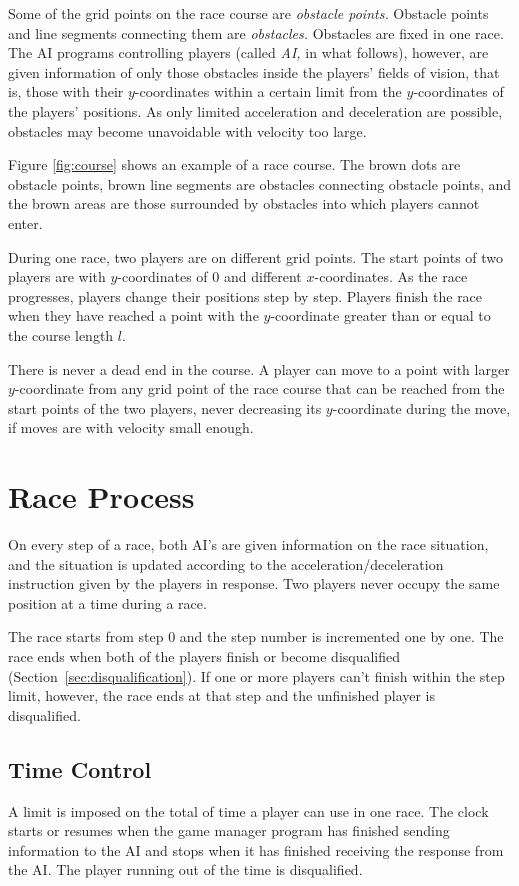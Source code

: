 \documentclass[11pt]{article}
\newcommand\secref[1]{\mbox{Section~\ref{#1}}}
\begin{document}
Some of the grid points on the race course are {\em obstacle points.}
Obstacle points and line segments connecting them are {\em obstacles.}
Obstacles are fixed in one race.  The AI programs controlling players
(called {\em AI,} in what follows), however, are given information of
only those obstacles inside the players' fields of vision, that is,
those with their $y$-coordinates within a certain limit from the
$y$-coordinates of the players' positions.  As only limited
acceleration and deceleration are possible, obstacles may become
unavoidable with velocity too large.

Figure \ref{fig:course} shows an example of a race course.  The brown
dots are obstacle points, brown line segments are obstacles connecting
obstacle points, and the brown areas are those surrounded by obstacles
into which players cannot enter.

During one race, two players are on different grid points.  The start
points of two players are with $y$-coordinates of $0$ and different
$x$-coordinates.  As the race progresses, players change their
positions step by step.  Players finish the race when they have reached
a point with the $y$-coordinate greater than or equal to the course
length $l$.

There is never a dead end in the course.  A player can move to a point
with larger $y$-coordinate from any grid point of the race course that
can be reached from the start points of the two players, never
decreasing its $y$-coordinate during the move, if moves are with
velocity small enough.

\section{Race Process}\label{sec:race_process}
On every step of a race, both AI's are given information on the race
situation, and the situation is updated according to the
acceleration/deceleration instruction given by the players in
response.  Two players never occupy the same position at a time during
a race.

The race starts from step 0 and the step number is incremented one by
one.  The race ends when both of the players finish or become disqualified (\secref{sec:disqualification}).  If one or more
players can't finish within the step limit, however, the race ends at
that step and the unfinished player is disqualified.

\subsection{Time Control}\label{sec:consideration_time}
A limit is imposed on the total of time a player can use in one race.
The clock starts or resumes when the game manager program has finished
sending information to the AI and stops when it has finished
receiving the response from the AI.  The player running out of
the time is disqualified.
\end{document}
